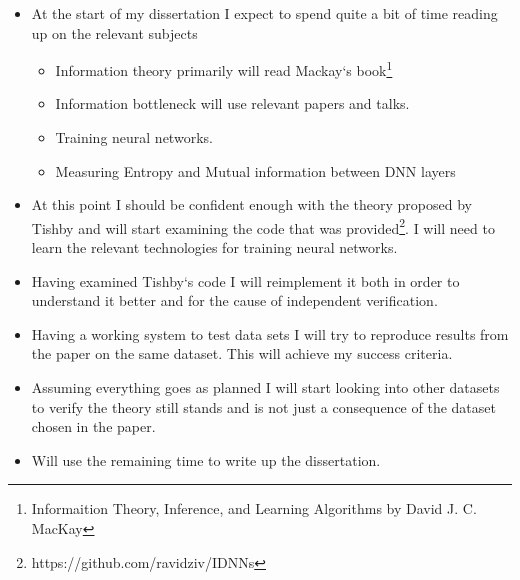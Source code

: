 \documentclass[12pt]{article}
\begin{document}



\begin{itemize}
  \item {

      At the start of my dissertation I expect to spend quite a bit of time
      reading up on the relevant subjects
      \begin{itemize}
        \item { 
          Information theory primarily will read Mackay`s
          book\footnote{Informaition Theory, Inference, and Learning Algorithms
          by David J. C. MacKay} 
        } \item { 
          Information bottleneck will use relevant papers and talks.
        } \item {
          Training neural networks. 
        } \item {
          Measuring Entropy and Mutual information between DNN layers
        }
      \end{itemize}
  } \item {

      At this point I should be confident enough with the theory proposed by
      Tishby and will start examining the code that was
      provided\footnote{https://github.com/ravidziv/IDNNs}.  I will need to
      learn the relevant technologies for training neural networks.
  } \item {

      Having examined Tishby`s code I will reimplement it both in order to
      understand it better and for the cause of independent verification.
  } \item {

      Having a working system to test data sets I will try to reproduce results
      from the paper on the same dataset. This will achieve my success criteria.
  } \item {

      Assuming everything goes as planned I will start looking into other
      datasets to verify the theory still stands and is not just a consequence
      of the dataset chosen in the paper.
  } \item {

      Will use the remaining time to write up the dissertation.
  }
\end{itemize}
\end{document}
